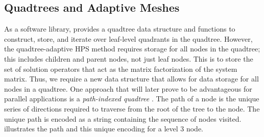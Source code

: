 \subsection{Quadtrees and Adaptive Meshes}

As a software library, \pforest provides a quadtree data structure and functions to construct, store, and iterate over leaf-level quadrants in the quadtree.  However, the quadtree-adaptive HPS method requires storage for all nodes in the quadtree; this includes children and parent nodes, not just leaf nodes. This is to store the set of solution operators that act as the matrix factorization of the system matrix. Thus, we require a new data structure that allows for data storage for all nodes in a quadtree. One approach that will later prove to be advantageous for parallel applications is a {\em path-indexed quadtree} \citep{woodward1982explicit,samet1984quadtree}. The path of a node is the unique series of directions required to traverse from the root of the tree to the node. The unique path is encoded as a string containing the sequence of nodes visited.   illustrates the path and this unique encoding for a level 3 node.



